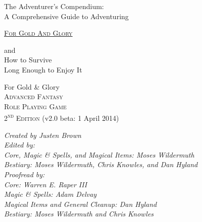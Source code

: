 \documentclass[9pt,twoside]{book}
\begin{document}
\frontmatter

\setcounter{page}{0}

\thispagestyle{empty} \pagebreak


\thispagestyle{empty}\mbox{}\pagebreak

\thispagestyle{empty}\mbox{}\pagebreak

\thispagestyle{empty} \begin{center}

\vspace*{1cm}

\Huge The Adventurer's Compendium: \\
A Comprehensive Guide to Adventuring 

\vspace{1cm}

\Huge \underline{\textsc{For Gold And Glory}}\texttrademark{}

\vspace{1cm}

\Huge and \\
How to Survive \\
Long Enough to Enjoy It

\vspace{2cm}

\begin{minipage}{0.38\textwidth}
\begin{flushleft} \large
For Gold \& Glory\texttrademark \\
\textsc{Advanced Fantasy}\\
\textsc{Role Playing Game}\\
\textsc{2\textsuperscript{nd} Edition} (v2.0 beta: 1 April 2014)
\end{flushleft}
\end{minipage}
\begin{minipage}{0.6\textwidth}
\begin{flushright} \large
\textit{Created by Justen Brown} \\
\textit{Edited by: } \\
\textit{Core, Magic \& Spells, and Magical Items: Moses Wildermuth} \\
\textit{Bestiary: Moses Wildermuth, Chris Knowles, and Dan Hyland} \\
\textit{Proofread by: } \\
\textit{Core: Warren E. Raper III} \\
\textit{Magic \& Spells: Adam Delvay} \\
\textit{Magical Items and  General  Cleanup: Dan Hyland} \\
\textit{Bestiary: Moses Wildermuth and Chris Knowles}
\end{flushright}
\end{minipage}



\end{center}
\end{document}
